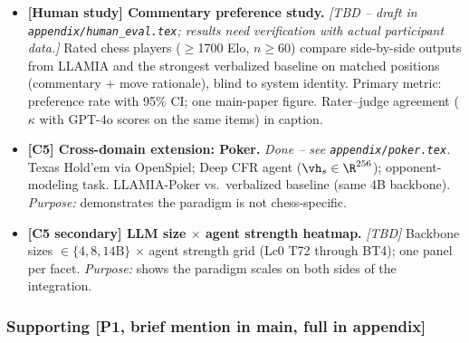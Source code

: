 \begin{itemize}[leftmargin=*]
    \item \textbf{[Human study] Commentary preference study.} \emph{[TBD -- draft in \texttt{appendix/human\_eval.tex}; results need verification with actual participant data.]}
    Rated chess players ($\geq$1700 Elo, $n \geq 60$) compare
    side-by-side outputs from LLAMIA and the strongest verbalized
    baseline on matched positions (commentary + move rationale),
    blind to system identity. Primary metric: preference rate with
    95\% CI; one main-paper figure. Rater--judge agreement
    ($\kappa$ with GPT-4o scores on the same items) in caption.

    \item \textbf{[C5] Cross-domain extension: Poker.} \emph{Done -- see \texttt{appendix/poker.tex}.}
    Texas Hold'em via OpenSpiel; Deep CFR agent ($\vh_s \in \R^{256}$);
    opponent-modeling task. LLAMIA-Poker vs.\ verbalized baseline (same 4B backbone).
    \emph{Purpose:} demonstrates the paradigm is not chess-specific.


    \item \textbf{[C5 secondary] LLM size $\times$ agent strength
    heatmap.} \emph{[TBD]} Backbone sizes $\in \{4, 8, 14\text{B}\}$ $\times$ agent
    strength grid (Lc0 T72 through BT4); one panel per facet.
    \emph{Purpose:} shows the paradigm scales on both sides of the integration.
\end{itemize}

\subsubsection*{Supporting [P1, brief mention in main, full in appendix]}

